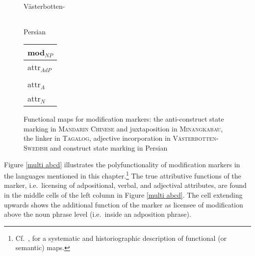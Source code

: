 \begin{figure}
{\begin{center}{\sc Västerbotten-}
\begin{tabular}{| l |}
\hline
\end{tabular}
\end{center}
}
\parbox[b]{0.20\textwidth}{
\begin{center}{\sc Persian}\\
\bigskip
\begin{tabular}{| l |}
\hline
{\sc mod}$_{NP}$\\
\hline
\hline
{\sc attr}$_{AdP}$\\
\hline
\\
\hline
{\sc attr}$_{A}$\\
\hline
{\sc attr}$_{N}$\\
\hline
\end{tabular}
\end{center}
}
\caption[Functional map for modification marking]{Functional maps for modification markers: the anti-construct state marking in \textsc{Mandarin Chinese} and juxtaposition in \textsc{Minangkabau}, the linker in \textsc{Tagalog}, adjective incorporation in \textsc{Västerbotten-Swedish} and construct state marking in {\sc Persian}}
\end{figure}
Figure \ref{multi abcd} illustrates the polyfunctionality of modification markers in the languages mentioned in this chapter.\footnote{Cf.~\cite{haspelmath2003}, for a systematic and historiographic description of functional (or semantic) maps.} The true attributive functions of the marker, i.e.~licensing of adpositional, verbal, and adjectival attributes, are found in the middle cells of the left column in Figure \ref{multi abcd}. The cell extending upwards shows the additional function of the marker as licensee of modification above the noun phrase level (i.e.~inside an adposition phrase).%

